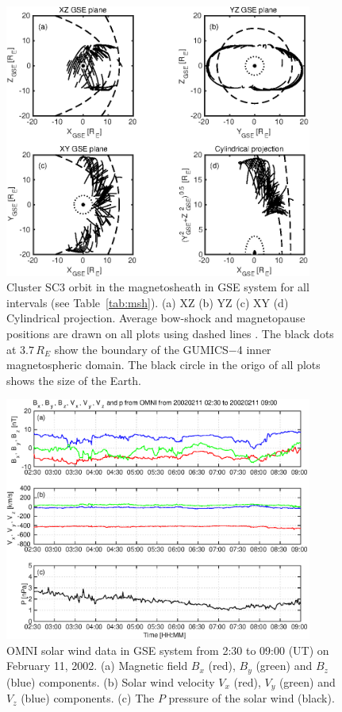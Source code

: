\documentclass[draft]{agujournal2019}
\begin{document}
\begin{figure}[h]
\centering
\includegraphics[width=0.9\textwidth,angle=0]{swe-2021sw002807-f06} 
\caption{Cluster SC3 orbit in the magnetosheath in GSE system for all intervals (see Table~\ref{tab:msh}). (a) XZ (b) YZ (c) XY (d) Cylindrical projection. Average bow-shock and magnetopause positions are drawn on all plots using dashed lines \cite[respectively]{peredo95:_three_alfven_mach,tsyganenko95:_model_earth}. The black dots at $3.7\,R_E$ show the boundary of the GUMICS$-$4 inner magnetospheric domain. The black circle in the origo of all plots shows the size of the Earth.}
\label{fig:mshorbit}
\end{figure}

\pagebreak

\begin{figure}[h]
\centering
\includegraphics[width=0.9\textwidth,angle=0]{swe-2021sw002807-f07} 
\caption{OMNI solar wind data in GSE system from 2:30 to 09:00 (UT) on February 11, 2002. (a) Magnetic field $B_{x}$ (red), $B_{y}$ (green) and $B_{z}$ (blue) components. (b) Solar wind velocity $V_{x}$ (red), $V_{y}$ (green) and $V_{z}$ (blue) components. (c) The $P$ pressure of the solar wind (black).}
\label{fig:mshomni}
\end{figure}
\end{document}
